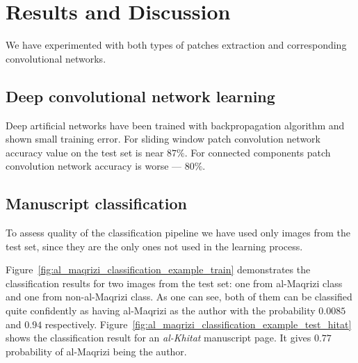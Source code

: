 \documentclass[conference,a4paper,twocolumn]{IEEEtran}
\begin{document}
\section{Results and Discussion}
\label{sec:results_and_description}

We have experimented with both types of patches extraction and corresponding convolutional networks. 

\subsection{Deep convolutional network learning}


Deep artificial networks have been trained with backpropagation algorithm \cite{CNN} and shown small training error. For sliding window patch convolution network accuracy value on the test set is near $87 \%$. For connected components patch convolution network accuracy is worse --- $80 \%$.    

\subsection{Manuscript classification}

To assess quality of the classification pipeline we have used only images from the test set, since they are the only ones not used in the learning process. 

Figure~\ref{fig:al_maqrizi_classification_example_train} demonstrates the classification results for two images from the test set: one from al-Maqrizi class and one from non-al-Maqrizi class. As one can see, both of them can be classified quite confidently as having al-Maqrizi as the author with the probability $0.0085$ and $0.94$ respectively. Figure~\ref{fig:al_maqrizi_classification_example_test_hitat} shows the classification result for an {\it al-Khitat} manuscript page. It gives $0.77$ probability of al-Maqrizi being the author.
\end{document}
